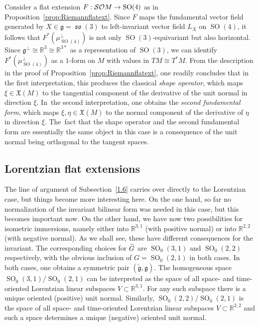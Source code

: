 \documentclass[AHL,Unicode,longabstracts]{cedram}
\DeclareMathOperator{\SO}{SO}
\DeclareMathOperator{\fkso}{\mathfrak{so}}
\newcommand*{\R}{\mathbb{R}}
\newcommand{\tfg}{\widetilde{\mathfrak g}}
\newcommand{\fkg}{\mathfrak{g}}
\newcommand{\fkX}{\mathfrak{X}}
\newcommand{\clSO}{\mathcal{SO}}
\renewcommand*{\to}{\mathchoice{\longrightarrow}{\rightarrow}{\rightarrow}{\rightarrow}}
\let\oldtilde\tilde
\renewcommand*{\tilde}[1]{\mathchoice{\widetilde{#1}}{\widetilde{#1}}{\oldtilde{#1}}{\oldtilde{#1}}}
\newcommand*{\R}{\mathbb{R}}
\begin{document}
\begin{rema}\label{rem:Rieman}
Consider a flat extension $F:\clSO M\to \SO(4)$ as in Proposition~\ref{prop:Riemannflatext}. Since $F$ maps the fundamental vector field generated by $X\in\fkg=\fkso(3)$ to left-invariant vector field $L_X$ on $\SO(4)$, it follows that $F^*(\mu_{\SO(4)}^\perp)$ is not only $\SO(3)$-equivariant but also horizontal. Since $\fkg^\perp\cong\R^3\cong\R^{3*}$ as a representation of $\SO(3)$, we can identify $F^*(\mu_{\SO(4)}^\perp)$ as a $1$-form on $M$ with values in $TM\cong T^*M$. From the description in the proof of Proposition~\ref{prop:Riemannflatext}, one readily concludes that in the first interpretation, this produces the classical \emph{shape operator}, which maps $\xi\in\fkX(M)$ to the tangential component of the derivative of the unit normal in direction $\xi$. In~the second interpretation, one obtains the \emph{second fundamental form}, which maps $\xi,\eta\in\fkX(M)$ to the normal component of the derivative of $\eta$ in direction $\xi$. The~fact that the shape operator and the second fundamental form are essentially the same object in this case is a consequence of the unit normal being orthogonal to the tangent spaces.
\end{rema}

\subsection{Lorentzian flat extensions}\label{1.7}

The line of argument of Subsection~\ref{1.6} carries over directly to the Lorentzian case, but things become more interesting here. On the one hand, so far no normalization of the invariant bilinear form was needed in this case, but this becomes important now. On the other hand, we have now two possibilities for isometric immersions, namely either into $\R^{3,1}$ (with positive normal) or into $\R^{2,2}$ (with negative normal). As we shall see, these have different consequences for the invariant. The corresponding choices for $\tilde G$ are $\SO_0(3,1)$ and $\SO_0(2,2)$ respectively, with the obvious inclusion of $G=\SO_0(2,1)$ in both cases. In both cases, one obtains a symmetric pair $(\tfg,\fkg)$. The homogeneous space $\SO_0(3,1)/\SO_0(2,1)$ can be interpreted as the space of all space- and time-oriented Lorentzian linear subspaces $V\subset\R^{3,1}$. For any such subspace there is a unique oriented (positive) unit normal. Similarly, $\SO_0(2,2)/\SO_0(2,1)$ is the space of all space- and time-oriented Lorentzian linear subspaces $V\subset\R^{2,2}$ and such a space determines a unique (negative) oriented unit normal.
\end{document}
